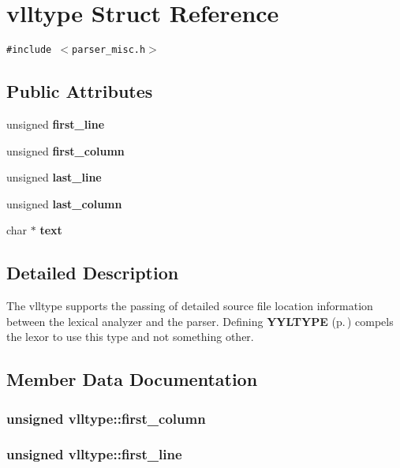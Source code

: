\section{vlltype  Struct Reference}
\label{structvlltype}
{\tt \#include $<$parser\_\-misc.h$>$}

\subsection*{Public Attributes}
\begin{CompactItemize}
\item 
unsigned {\bf first\_\-line}
\item 
unsigned {\bf first\_\-column}
\item 
unsigned {\bf last\_\-line}
\item 
unsigned {\bf last\_\-column}
\item 
char $\ast$ {\bf text}
\end{CompactItemize}


\subsection{Detailed Description}
The vlltype supports the passing of detailed source file location information between the lexical analyzer and the parser. Defining {\bf YYLTYPE} {\rm (p.\,\pageref{structYYLTYPE})} compels the lexor to use this type and not something other. 



\subsection{Member Data Documentation}
\subsubsection{\setlength{\rightskip}{0pt plus 5cm}unsigned vlltype::first\_\-column}\label{structvlltype_m1}


\subsubsection{\setlength{\rightskip}{0pt plus 5cm}unsigned vlltype::first\_\-line}\label{structvlltype_m0}


